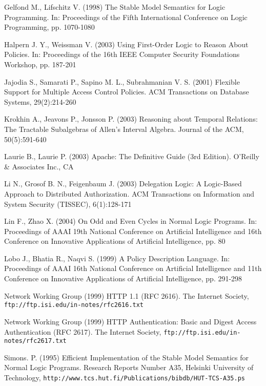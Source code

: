 \documentclass[glov2,twocolumn,final]{svjour2}
\begin{document}
\begin{thebibliography}{5}
      Gelfond M., Lifschitz V.
      (1998)
      The Stable Model Semantics for Logic Programming.
      In: Proceedings of the Fifth International Conference on Logic
      Programming,
      pp. 1070-1080

      Halpern J. Y., Weissman V.
      (2003)
      Using First-Order Logic to Reason About Policies.
      In: Proceedings of the 16th IEEE Computer Security Foundations
      Workshop, pp. 187-201

      Jajodia S., Samarati P., Sapino M. L., Subrahmanian V. S.
      (2001)
      Flexible Support for Multiple Access Control Policies.
      ACM Transactions on Database Systems,
      29(2):214-260

      Krokhin A., Jeavons P., Jonsson P.
      (2003)
      Reasoning about Temporal Relations: The Tractable Subalgebras of
      Allen's Interval Algebra.
      Journal of the ACM,
      50(5):591-640

      Laurie B., Laurie P.
      (2003)
      Apache: The Definitive Guide (3rd Edition).
      O'Reilly \& Associates Inc., CA

      Li N., Grosof B. N., Feigenbaum J.
      (2003)
      Delegation Logic: A Logic-Based Approach to Distributed Authorization.
      ACM Transactions on Information and System Security (TISSEC),
      6(1):128-171

      Lin F., Zhao X.
      (2004)
      On Odd and Even Cycles in Normal Logic Programs.
      In: Proceedings of AAAI 19th National Conference on Artificial
      Intelligence and 16th Conference on Innovative Applications of Artificial
      Intelligence,
      pp. 80

      Lobo J., Bhatia R., Naqvi S.
      (1999)
      A Policy Description Language.
      In: Proceedings of AAAI 16th National Conference on Artificial
      Intelligence and 11th Conference on Innovative Applications of Artificial
      Intelligence,
      pp. 291-298

      Network Working Group
      (1999)
      HTTP 1.1 (RFC 2616).
      The Internet Society,
      {\tt \scriptsize ftp://ftp.isi.edu/in-notes/rfc2616.txt}

      Network Working Group
      (1999)
      HTTP Authentication: Basic and Digest Access Authentication (RFC 2617).
      The Internet Society,
      {\tt \scriptsize ftp://ftp.isi.edu/in-notes/rfc2617.txt}

      Simons. P.
      (1995)
      Efficient Implementation of the Stable Model Semantics for Normal Logic
      Programs.
      Research Reports Number A35, Helsinki University of Technology,
      {\tt \scriptsize http://www.tcs.hut.fi/Publications/bibdb/HUT-TCS-A35.ps}
  \end{thebibliography}
\end{document}
